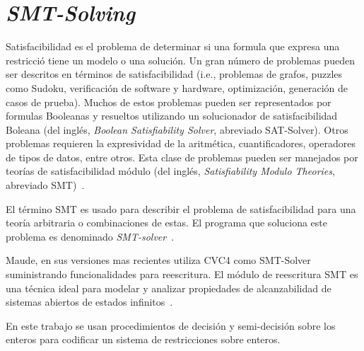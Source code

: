 \section{\textit{SMT-Solving}}
\label{smt.prelim}

Satisfacibilidad es el problema de determinar si una formula que expresa una 
restricci\'o tiene un modelo o una soluci\'on. Un gran n\'umero de problemas 
pueden ser descritos en t\'erminos de satisfacibilidad (i.e., problemas de 
grafos, puzzles como Sudoku, verificaci\'on de software y hardware, 
optimizaci\'on, generaci\'on de casos de prueba). Muchos de estos 
problemas pueden ser representados por formulas Booleanas y resueltos 
utilizando un solucionador de satisfacibilidad Boleana (del ingl\'es, \textit{Boolean 
Satisfiability Solver}, abreviado SAT-Solver). Otros problemas requieren 
la expresividad de la aritm\'etica, cuantificadores, operadores de tipos de 
datos, entre otros. Esta clase de problemas pueden ser manejados por 
teor\'ias de satisfacibilidad m\'odulo (del ingl\'es, \textit{Satisfiability 
Modulo Theories}, abreviado SMT)~\cite{deMoura2007}. 

El t\'ermino SMT es usado para describir el problema de satisfacibilidad 
para una teor\'ia arbitraria o combinaciones de estas. El programa que 
soluciona este problema es denominado \textit{SMT-solver}~\cite{Kroening:2008:DPA:1391237}.

Maude, en sus versiones mas recientes utiliza CVC4 como SMT-Solver 
suministrando funcionalidades para reescritura. El m\'odulo de reescritura SMT 
es una t\'ecnica ideal para modelar y analizar propiedades de alcanzabilidad de
sistemas abiertos de estados infinitos~\cite{Rocha2017269}.

En este trabajo se usan procedimientos de decisi\'on y semi-decisi\'on 
sobre los enteros para codificar un sistema de restricciones sobre enteros.
